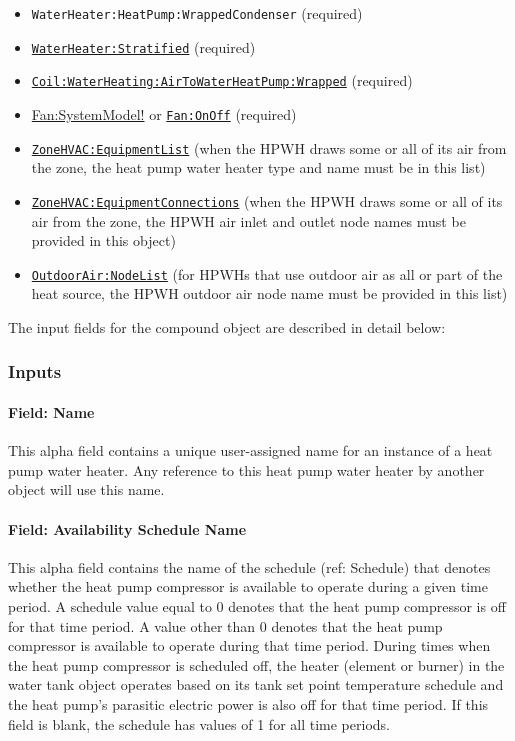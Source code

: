 \begin{itemize}
\item
  \lstinline!WaterHeater:HeatPump:WrappedCondenser! (required)
\item
  \hyperref[waterheaterstratified]{\lstinline!WaterHeater:Stratified!} (required)
\item
  \hyperref[coilwaterheatingairtowaterheatpumpwrapped]{\lstinline!Coil:WaterHeating:AirToWaterHeatPump:Wrapped!} (required)
\item
  \hyperref[fansystemmodel]{Fan:SystemModel!} or \hyperref[fanonoff]{\lstinline!Fan:OnOff!} (required)
\item
  \hyperref[zonehvacequipmentlist]{\lstinline!ZoneHVAC:EquipmentList!} (when the HPWH draws some or all of its air from the zone, the heat pump water heater type and name must be in this list)
\item
  \hyperref[zonehvacequipmentconnections]{\lstinline!ZoneHVAC:EquipmentConnections!} (when the HPWH draws some or all of its air from the zone, the HPWH air inlet and outlet node names must be provided in this object)
\item
  \hyperref[outdoorairnodelist]{\lstinline!OutdoorAir:NodeList!} (for HPWHs that use outdoor air as all or part of the heat source, the HPWH outdoor air node name must be provided in this list)
\end{itemize}

The input fields for the compound object are described in detail below:

\subsubsection{Inputs}\label{inputs-4-037}

\paragraph{Field: Name}\label{field-name-3-036}

This alpha field contains a unique user-assigned name for an instance of a heat pump water heater. Any reference to this heat pump water heater by another object will use this name.

\paragraph{Field: Availability Schedule Name}\label{field-availability-schedule-name-1-014}

This alpha field contains the name of the schedule (ref: Schedule) that denotes whether the heat pump compressor is available to operate during a given time period. A schedule value equal to 0 denotes that the heat pump compressor is off for that time period. A value other than 0 denotes that the heat pump compressor is available to operate during that time period. During times when the heat pump compressor is scheduled off, the heater (element or burner) in the water tank object operates based on its tank set point temperature schedule and the heat pump's parasitic electric power is also off for that time period. If this field is blank, the schedule has values of 1 for all time periods.

